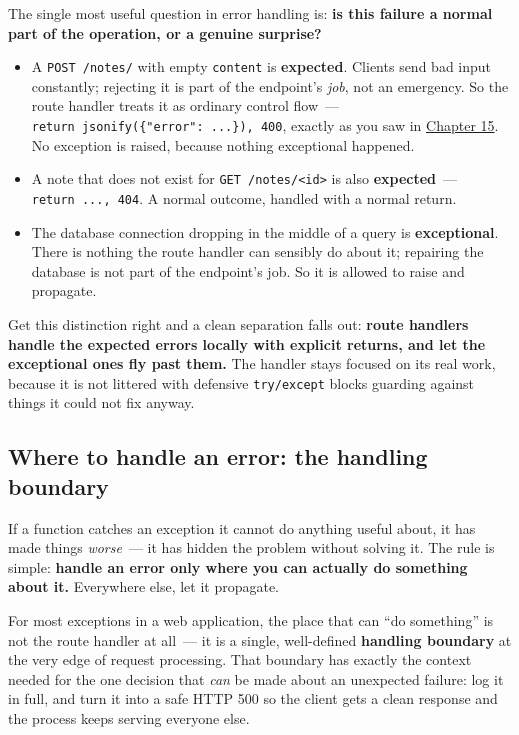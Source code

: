 The single most useful question in error handling is: \textbf{is this failure a normal part of the operation, or a genuine surprise?}

\begin{itemize}
\tightlist
\item
  A \texttt{POST\ /notes/} with empty \texttt{content} is \textbf{expected}. Clients send bad input constantly; rejecting it is part of the endpoint's \emph{job}, not an emergency. So the route handler treats it as ordinary control flow~--- \texttt{return\ jsonify(\{"error":}\allowbreak{}\texttt{\ .}\allowbreak{}\texttt{.}\allowbreak{}\texttt{.}\allowbreak{}\texttt{\}),}\allowbreak{}\texttt{\ 400}, exactly as you saw in \hyperref[ch:15-structuring-the-application]{Chapter 15}. No exception is raised, because nothing exceptional happened.
\item
  A note that does not exist for \texttt{GET\ /notes/\textless{}id\textgreater{}} is also \textbf{expected}~--- \texttt{return\ ...,\ 404}. A normal outcome, handled with a normal return.
\item
  The database connection dropping in the middle of a query is \textbf{exceptional}. There is nothing the route handler can sensibly do about it; repairing the database is not part of the endpoint's job. So it is allowed to raise and propagate.
\end{itemize}

\noindent{}Get this distinction right and a clean separation falls out: \textbf{route handlers handle the expected errors locally with explicit returns, and let the exceptional ones fly past them.} The handler stays focused on its real work, because it is not littered with defensive \texttt{try/except} blocks guarding against things it could not fix anyway.

\subsection*{Where to handle an error: the handling boundary}\label{16-logging-error-handling:where-to-handle-an-error-the-handling-boundary}

If a function catches an exception it cannot do anything useful about, it has made things \emph{worse}~--- it has hidden the problem without solving it. The rule is simple: \textbf{handle an error only where you can actually do something about it.} Everywhere else, let it propagate.

For most exceptions in a web application, the place that can ``do something'' is not the route handler at all~--- it is a single, well-defined \textbf{handling boundary} at the very edge of request processing. That boundary has exactly the context needed for the one decision that \emph{can} be made about an unexpected failure: log it in full, and turn it into a safe HTTP 500 so the client gets a clean response and the process keeps serving everyone else.

